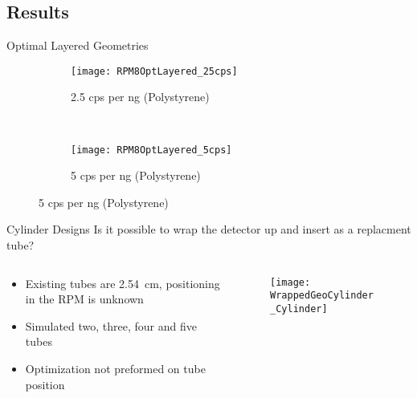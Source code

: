 \subsection{Results}
\begin{frame}{Optimal Layered Geometries}
\begin{figure}
    \centering
    \begin{subfigure}[b]{0.45\textwidth}
        \texttt{[image: RPM8OptLayered\_25cps]}
        \caption{2.5 cps per ng  (Polystyrene)}
    \end{subfigure}%
    ~
    \begin{subfigure}[b]{0.45\textwidth}
        \texttt{[image: RPM8OptLayered\_5cps]}
        \caption{5 cps per ng  (Polystyrene)}
    \end{subfigure}
\end{figure}
\end{frame}
\begin{frame}{Cylinder Designs}
Is it possible to wrap the detector up and insert as a replacment tube?
\begin{columns}[onlytextwidth]
  \begin{column}{0.48\textwidth}
    \small
    \begin{itemize}
      \item Existing tubes are \SI{2.54}{\cm}, positioning in the RPM is unknown
      \item Simulated two, three, four and five tubes
      \item Optimization not preformed on tube position
    \end{itemize}
    \end{column}
  \begin{column}{0.5\textwidth}
    \begin{figure}
      \texttt{[image: WrappedGeoCylinder\_Cylinder]}
    \end{figure}
  \end{column}
\end{columns}
\end{frame}
